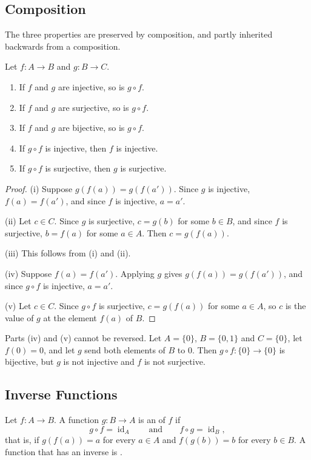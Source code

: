 \subsection{Composition}

The three properties are preserved by composition, and partly inherited backwards from a composition.

\begin{proposition}
\label{prop:composition-injective}
Let $f\colon A\to B$ and $g\colon B\to C$.
\begin{enumerate}
\item If $f$ and $g$ are injective, so is $g\circ f$.
\item If $f$ and $g$ are surjective, so is $g\circ f$.
\item If $f$ and $g$ are bijective, so is $g\circ f$.
\item If $g\circ f$ is injective, then $f$ is injective.
\item If $g\circ f$ is surjective, then $g$ is surjective.
\end{enumerate}
\end{proposition}

\begin{proof}
(i) Suppose $g(f(a))=g(f(a'))$. Since $g$ is injective, $f(a)=f(a')$, and since $f$ is injective, $a=a'$.

(ii) Let $c\in C$. Since $g$ is surjective, $c=g(b)$ for some $b\in B$, and since $f$ is surjective, $b=f(a)$ for some $a\in A$. Then $c=g(f(a))$.

(iii) This follows from (i) and (ii).

(iv) Suppose $f(a)=f(a')$. Applying $g$ gives $g(f(a))=g(f(a'))$, and since $g\circ f$ is injective, $a=a'$.

(v) Let $c\in C$. Since $g\circ f$ is surjective, $c=g(f(a))$ for some $a\in A$, so $c$ is the value of $g$ at the element $f(a)$ of $B$.
\end{proof}

Parts (iv) and (v) cannot be reversed. Let $A=\{0\}$, $B=\{0,1\}$ and $C=\{0\}$, let $f(0)=0$, and let $g$ send both elements of $B$ to $0$. Then $g\circ f\colon\{0\}\to\{0\}$ is bijective, but $g$ is not injective and $f$ is not surjective.

\subsection{Inverse Functions}

\begin{definition}
\label{def:inverse}
Let $f\colon A\to B$. A function $g\colon B\to A$ is an  of $f$ if
\[
g\circ f=\operatorname{id}_A\qquad\text{and}\qquad f\circ g=\operatorname{id}_B ,
\]
that is, if $g(f(a))=a$ for every $a\in A$ and $f(g(b))=b$ for every $b\in B$. A function that has an inverse is .
\end{definition}

